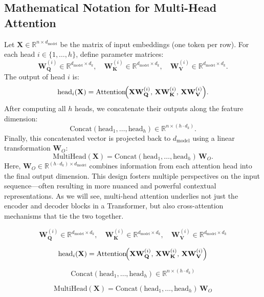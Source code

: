 \subsection{Mathematical Notation for Multi-Head Attention}
\noindent
Let $\mathbf{X} \in \mathbb{R}^{n \times d_\text{model}}$ be the matrix of input embeddings (one token per row). For each head $i \in \{1, \ldots, h\}$, define parameter matrices:
\[
\mathbf{W}_\mathbf{Q}^{(i)} \in \mathbb{R}^{d_\text{model} \times d_k}, \quad
\mathbf{W}_\mathbf{K}^{(i)} \in \mathbb{R}^{d_\text{model} \times d_k}, \quad
\mathbf{W}_\mathbf{V}^{(i)} \in \mathbb{R}^{d_\text{model} \times d_k}.
\]
The output of head $i$ is:
\[
\text{head}_i(\mathbf{X}) = \text{Attention}\!\Bigl(\mathbf{X}\mathbf{W}_\mathbf{Q}^{(i)},\, \mathbf{X}\mathbf{W}_\mathbf{K}^{(i)},\, \mathbf{X}\mathbf{W}_\mathbf{V}^{(i)}\Bigr).
\]
After computing all $h$ heads, we concatenate their outputs along the feature dimension:
\[
\text{Concat}(\text{head}_1, \ldots, \text{head}_h) \in \mathbb{R}^{n \times (h \cdot d_k)}.
\]
Finally, this concatenated vector is projected back to $d_\text{model}$ using a linear transformation $\mathbf{W}_O$:
\[
\text{MultiHead}(\mathbf{X}) 
= \text{Concat}(\text{head}_1, \ldots, \text{head}_h)\,\mathbf{W}_O.
\]
\noindent
Here, $\mathbf{W}_O \in \mathbb{R}^{(h \cdot d_k) \times d_\text{model}}$ combines information from each attention head into the final output dimension. This design fosters multiple perspectives on the input sequence—often resulting in more nuanced and powerful contextual representations. As we will see, multi-head attention underlies not just the encoder and decoder blocks in a Transformer, but also cross-attention mechanisms that tie the two together. 

\begin{equation}\label{eq:mha_params}
\mathbf{W}_\mathbf{Q}^{(i)} \in \mathbb{R}^{d_\text{model} \times d_k}, \quad
\mathbf{W}_\mathbf{K}^{(i)} \in \mathbb{R}^{d_\text{model} \times d_k}, \quad
\mathbf{W}_\mathbf{V}^{(i)} \in \mathbb{R}^{d_\text{model} \times d_k}
\end{equation}

\begin{equation}\label{eq:single_head}
\text{head}_i(\mathbf{X}) = \text{Attention}\!\Bigl(\mathbf{X}\mathbf{W}_\mathbf{Q}^{(i)},\, \mathbf{X}\mathbf{W}_\mathbf{K}^{(i)},\, \mathbf{X}\mathbf{W}_\mathbf{V}^{(i)}\Bigr)
\end{equation}

\begin{equation}\label{eq:head_concat}
\text{Concat}(\text{head}_1, \ldots, \text{head}_h) \in \mathbb{R}^{n \times (h \cdot d_k)}
\end{equation}

\begin{equation}\label{eq:multihead_final}
\text{MultiHead}(\mathbf{X}) 
= \text{Concat}(\text{head}_1, \ldots, \text{head}_h)\,\mathbf{W}_O
\end{equation} 
